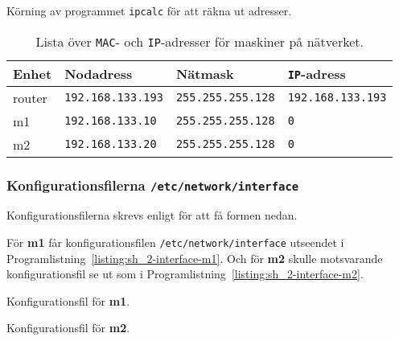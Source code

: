 \begin{listing}[H]
  \caption{Körning av programmet \texttt{ipcalc} för att räkna ut adresser.}
  \label{listing:sh_2-ipcalc}
\end{listing}


\begin{table}[]
  \centering
  \caption{Lista över \texttt{MAC}- och \texttt{IP}-adresser för maskiner på
           nätverket.}
  \label{table:interface-config}
  \begin{tabular}{@{}llll@{}}
    \toprule
    Enhet  & Nodadress                & Nätmask                  & \texttt{IP}-adress          \\ \midrule
    router & \texttt{192.168.133.193} & \texttt{255.255.255.128} & \texttt{192.168.133.193} \\
    m1     & \texttt{192.168.133.10}  & \texttt{255.255.255.128} & \texttt{0}        \\
    m2     & \texttt{192.168.133.20}  & \texttt{255.255.255.128} & \texttt{0}      \\ \bottomrule
  \end{tabular}
\end{table}


\subsubsection{Konfigurationsfilerna \texttt{/etc/network/interface}}
Konfigurationsfilerna skrevs enligt \cite{debian:network} för att få formen
nedan.

För \textbf{m1} får konfigurationsfilen \texttt{/etc/network/interface}
utseendet i Programlistning~\ref{listing:sh_2-interface-m1}.  Och för
\textbf{m2} skulle motsvarande konfigurationsfil se ut som i
Programlistning~\ref{listing:sh_2-interface-m2}.


\begin{listing}[H]
  \caption{Konfigurationsfil för \textbf{m1}.}
  \label{listing:sh_2-interface-m1}
\end{listing}

\begin{listing}[H]
  \caption{Konfigurationsfil för \textbf{m2}.}
  \label{listing:sh_2-interface-m2}
\end{listing}
